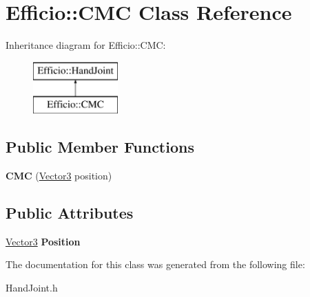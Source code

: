 \hypertarget{class_efficio_1_1_c_m_c}{}\section{Efficio\+:\+:C\+MC Class Reference}
\label{class_efficio_1_1_c_m_c}
Inheritance diagram for Efficio\+:\+:C\+MC\+:\begin{figure}[H]
\begin{center}
\leavevmode
\includegraphics[height=2.000000cm]{class_efficio_1_1_c_m_c}
\end{center}
\end{figure}
\subsection*{Public Member Functions}
\begin{DoxyCompactItemize}
\item 
\hypertarget{class_efficio_1_1_c_m_c_a9910bf1a2e57d408a7fbe45db8f11221}{}\label{class_efficio_1_1_c_m_c_a9910bf1a2e57d408a7fbe45db8f11221} 
{\bfseries C\+MC} (\hyperlink{class_efficio_1_1_vector3}{Vector3} position)
\end{DoxyCompactItemize}
\subsection*{Public Attributes}
\begin{DoxyCompactItemize}
\item 
\hypertarget{class_efficio_1_1_c_m_c_a7fc6f6e48c69861a9f9acdf2c4411c39}{}\label{class_efficio_1_1_c_m_c_a7fc6f6e48c69861a9f9acdf2c4411c39} 
\hyperlink{class_efficio_1_1_vector3}{Vector3} {\bfseries Position}
\end{DoxyCompactItemize}


The documentation for this class was generated from the following file\+:\begin{DoxyCompactItemize}
\item 
Hand\+Joint.\+h\end{DoxyCompactItemize}
